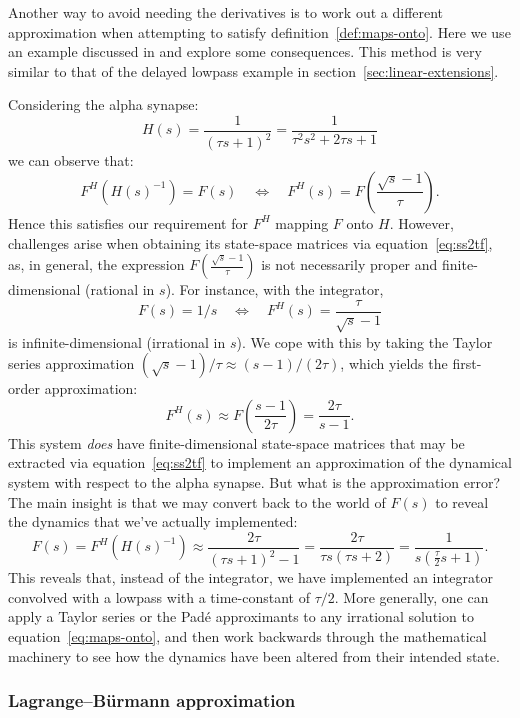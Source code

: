 Another way to avoid needing the derivatives is to work out a different approximation when attempting to satisfy definition~\ref{def:maps-onto}.
Here we use an example discussed in \citet{dynamicspatent} and explore some consequences.
This method is very similar to that of the delayed lowpass example in section~\ref{sec:linear-extensions}.

Considering the alpha synapse:
$$H(s) = \frac{1}{(\tau s + 1)^2} = \frac{1}{\tau^2 s^2 + 2\tau s + 1}$$
we can observe that:
$$F^H \left( H(s)^{-1} \right) = F(s) \quad \iff \quad F^H(s) = F \left( \frac{\sqrt{s} - 1}{\tau} \right) \text{.}$$
Hence this satisfies our requirement for $F^H$ mapping $F$ onto $H$.
However, challenges arise when obtaining its state-space matrices via equation~\ref{eq:ss2tf}, as,
in general, the expression $F \left( \frac{\sqrt{s} - 1}{\tau} \right)$ is not necessarily proper and finite-dimensional (rational in $s$). For instance, with the integrator,
$$F(s) = 1/s \quad \iff \quad F^H(s) = \frac{\tau}{\sqrt{s} - 1}$$
is infinite-dimensional (irrational in $s$).
We cope with this by taking the Taylor series approximation $(\sqrt{s} - 1) / \tau \approx \left( s - 1 \right) / (2 \tau)$, which yields the first-order approximation:
\begin{equation} \label{eq:taylor-integral}
F^H(s) \approx F \left( \frac{s-1}{2\tau} \right) = \frac{2 \tau}{s - 1} \text{.}
\end{equation}
This system \emph{does} have finite-dimensional state-space matrices that may be extracted via equation~\ref{eq:ss2tf} to implement an approximation of the dynamical system with respect to the alpha synapse.
But what is the approximation error?
The main insight is that we may convert back to the world of $F(s)$ to reveal the dynamics that we've actually implemented:
$$F(s) = F^H \left( H(s)^{-1} \right) \approx \frac{2\tau}{(\tau s + 1)^2 - 1} = \frac{2\tau}{\tau s (\tau s + 2)} = \frac{1}{s \left( \frac{\tau}{2} s + 1 \right) } \text{.}$$
This reveals that, instead of the integrator, we have implemented an integrator convolved with a lowpass with a time-constant of $\tau / 2$.
More generally, one can apply a Taylor series or the Pad\'e approximants to any irrational solution to equation~\ref{eq:maps-onto}, and then work backwards through the mathematical machinery to see how the dynamics have been altered from their intended state. 

\subsubsection{Lagrange--B\"urmann approximation}

